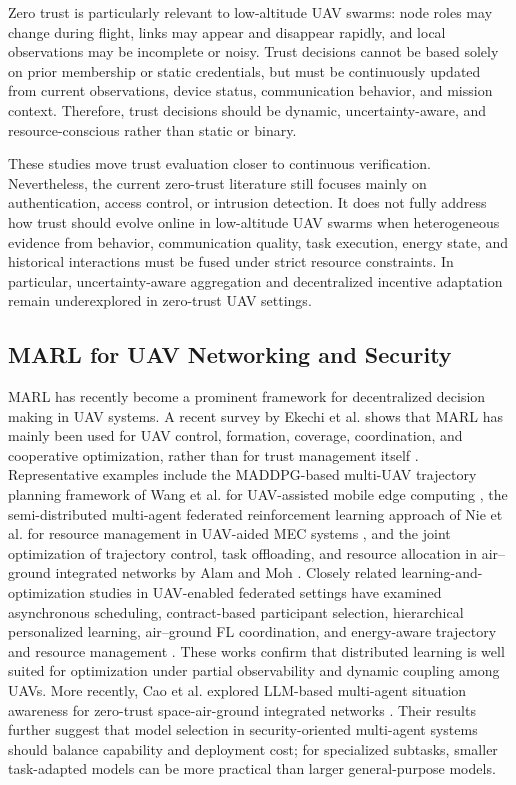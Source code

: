 \documentclass[notspecified,article,submit,moreauthors]{Definitions/mdpi}
\begin{document}
Zero trust is particularly relevant to low-altitude UAV swarms: node roles may change during flight, links may appear and disappear rapidly, and local observations may be incomplete or noisy. Trust decisions cannot be based solely on prior membership or static credentials, but must be continuously updated from current observations, device status, communication behavior, and mission context. Therefore, trust decisions should be dynamic, uncertainty-aware, and resource-conscious rather than static or binary.

These studies move trust evaluation closer to continuous verification. Nevertheless, the current zero-trust literature still focuses mainly on authentication, access control, or intrusion detection. It does not fully address how trust should evolve online in low-altitude UAV swarms when heterogeneous evidence from behavior, communication quality, task execution, energy state, and historical interactions must be fused under strict resource constraints. In particular, uncertainty-aware aggregation and decentralized incentive adaptation remain underexplored in zero-trust UAV settings.

\subsection{MARL for UAV Networking and Security}
MARL has recently become a prominent framework for decentralized decision making in UAV systems. A recent survey by Ekechi et al. shows that MARL has mainly been used for UAV control, formation, coverage, coordination, and cooperative optimization, rather than for trust management itself \cite{ekechi2025survey}. Representative examples include the MADDPG-based multi-UAV trajectory planning framework of Wang et al. for UAV-assisted mobile edge computing \cite{wang2020trajectory}, the semi-distributed multi-agent federated reinforcement learning approach of Nie et al. for resource management in UAV-aided MEC systems \cite{nie2021resource}, and the joint optimization of trajectory control, task offloading, and resource allocation in air--ground integrated networks by Alam and Moh \cite{alam2024joint}. Closely related learning-and-optimization studies in UAV-enabled federated settings have examined asynchronous scheduling, contract-based participant selection, hierarchical personalized learning, air--ground FL coordination, and energy-aware trajectory and resource management \cite{yang2021ppfluav,lim2021contractfl,wang2023hnpfl,qureshi2024asynfl,jing2023agifl,fu2025energyfl}. These works confirm that distributed learning is well suited for optimization under partial observability and dynamic coupling among UAVs. More recently, Cao et al. explored LLM-based multi-agent situation awareness for zero-trust space-air-ground integrated networks \cite{cao2025sagin}. Their results further suggest that model selection in security-oriented multi-agent systems should balance capability and deployment cost; for specialized subtasks, smaller task-adapted models can be more practical than larger general-purpose models.
\end{document}
